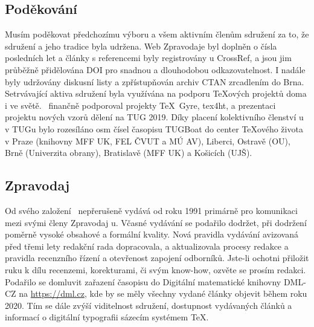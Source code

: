 \subsection*{Poděkování}
Musím poděkovat předchozímu výboru a všem aktivním členům sdružení za to, že sdružení a jeho tradice byla udržena. Web Zpravodaje byl doplněn o čísla posledních let a články s referencemi byly registrovány u CrossRef, a jsou jim průběžně přidělována DOI pro snadnou a dlouhodobou odkazovatelnost.  I nadále byly udržovány diskusní listy a zpřístupňován archiv CTAN zrcadlením do Brna.
Setrvávající aktiva sdružení byla využívána na podporu \TeX ových projektů doma i ve světě. \CSTUG\ finančně podporoval projekty \TeX\ Gyre, tex4ht, a prezentaci projektu nových vzorů dělení na TUG 2019. Díky placení kolektivního členství \CSTUG u v TUGu bylo rozesíláno osm čísel časopisu TUGBoat do center \TeX ového života v Praze (knihovny MFF UK, FEL ČVUT a MÚ AV), Liberci, Ostravě (OU), Brně (Univerzita obrany), Bratislavě (MFF UK) a Košicích (UJŠ).
\subsection*{Zpravodaj}
Od svého založení \CSTUG\ nepřerušeně vydává od roku 1991 primárně pro komunikaci mezi svými členy Zpravodaj \CSTUG u.  Včasné vydávání se podařilo dodržet, při dodržení poměrně vysoké obsahové a formální kvality.  Nová pravidla vydávání avizovaná před třemi lety redakční rada dopracovala, a aktualizovala procesy redakce a pravidla recenzního řízení a otevřenost zapojení odborníků.  Jste-li ochotni přiložit ruku k dílu recenzemi, korekturami, či svým know-how, ozvěte se prosím redakci.
Podařilo se domluvit zařazení časopisu do Digitální matematické knihovny DML-CZ na \url{https://dml.cz}, kde by se měly všechny vydané články objevit během roku 2020.  Tím se dále zvýší viditelnost sdružení, dostupnost vydávaných článků a informací o digitální typografii sázecím systémem \TeX.
